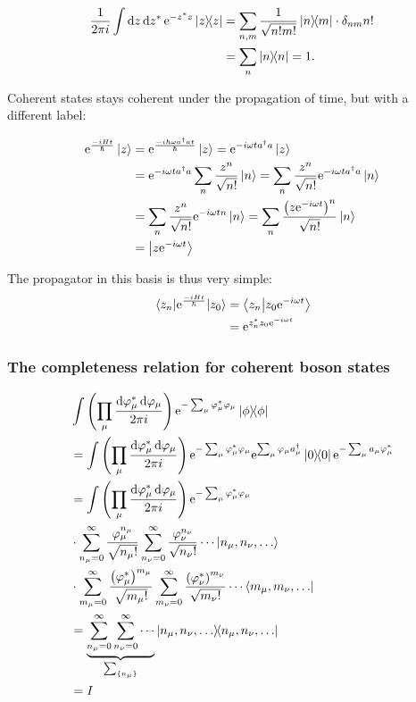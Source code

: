 \begin{align*}
\frac{1}{2\pi i}\int\dd z \dd{z^*}\e^{-z^*z}\dyad z &= \sum_{n, m}\frac{1}{\sqrt{n!m!}}\dyad{n}{m}\cdot \delta_{nm}n! \\
&= \sum_{n}\dyad{n} = 1.
\end{align*}

Coherent states stays coherent under the propagation of time, but with a different label:

\begin{align*}
\mathrm{e}^{\frac{-iHt}{\hbar}}\ket z &= \mathrm{e}^{\frac{-i\hbar\omega a^\dagger at}{\hbar}}\ket z = \mathrm{e}^{-i\omega ta^\dagger a}\ket z \\
&= \mathrm{e}^{-i\omega ta^\dagger a}\sum_n\frac{z^n}{\sqrt{n!}}\ket n = \sum_n\frac{z^n}{\sqrt{n!}}\mathrm{e}^{-i\omega ta^\dagger a}\ket n \\
&=  \sum_n\frac{z^n}{\sqrt{n!}}\mathrm{e}^{-i\omega tn}\ket n = \sum_n\frac{\left(z\mathrm{e}^{-i\omega t}\right)^n}{\sqrt{n!}}\ket n \\
&= \ket{z\mathrm{e}^{-i\omega t}}
\end{align*}

The propagator in this basis is thus very simple:
\begin{align}
\mel{z_n}{\mathrm{e}^{\frac{-iHt}{\hbar}}}{z_0} &= \braket{z_n}{z_0\mathrm{e}^{-i\omega t}} \\
&= \mathrm{e}^{z_n^*z_0\mathrm{e}^{-i\omega t}}
\end{align}

\subsubsection*{The completeness relation for coherent boson states}

\begin{align*}
&\int\left(\prod_\mu\frac{\dd{\varphi_\mu^*}\dd{\varphi_\mu}}{2\pi i}\right)\e^{-\sum_\mu\varphi_\mu^*\varphi_\mu}\dyad{\phi}  \\
&= \int\left(\prod_\mu\frac{\dd{\varphi_\mu^*}\dd{\varphi_\mu}}{2\pi i}\right)\e^{-\sum_\mu\varphi_\mu^*\varphi_\mu}\e^{\sum_\mu\varphi_\mu a_\mu^\dagger}\dyad 0 \e^{-\sum_\mu a_\mu\varphi_\mu^*} \\
&=\int\left(\prod_\mu\frac{\dd{\varphi_\mu^*}\dd{\varphi_\mu}}{2\pi i}\right)\e^{-\sum_\mu\varphi_\mu^*\varphi_\mu} \\
&\cdot \sum_{n_{\mu}=0}^\infty\frac{\varphi_\mu^{n_\mu}}{\sqrt{n_\mu!}}\sum_{n_{\nu}=0}^\infty\frac{\varphi_\nu^{n_\nu}}{\sqrt{n_\nu!}}\cdots\ket{n_\mu, n_\nu, \dots}\\
&\cdot \sum_{m_{\mu}=0}^\infty\frac{\left(\varphi_\mu^*\right)^{m_\mu}}{\sqrt{m_\mu!}}\sum_{m_{\nu}=0}^\infty\frac{\left(\varphi_\nu^*\right)^{m_\nu}}{\sqrt{m_\nu!}}\cdots \bra{m_\mu, m_\nu, \dots} \\
&= \underbrace{\sum_{n_\mu = 0}^\infty\sum_{n_\nu = 0}^\infty\cdots}_{\sum_{\{n_\mu\}}} \dyad{n_\mu, n_\nu, \dots} \\
&= I
\end{align*}


